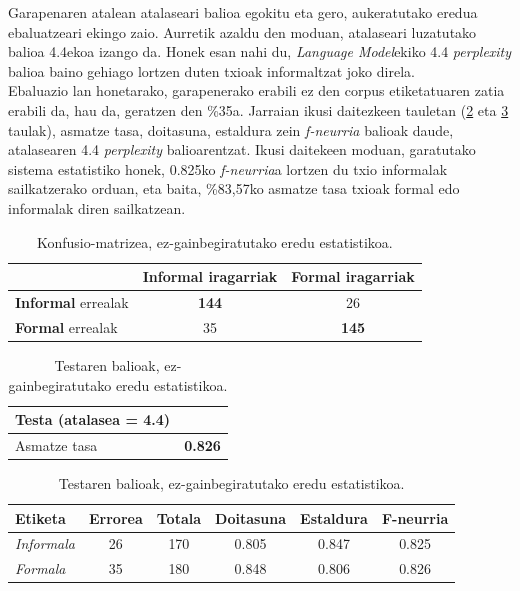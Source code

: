 \documentclass[information,article,submit,moreauthors,pdftex,10pt,a4paper]{Definitions/mdpi}
\begin{document}
\indent Garapenaren atalean atalaseari balioa egokitu eta gero, aukeratutako eredua ebaluatzeari ekingo zaio. Aurretik azaldu den moduan, atalaseari luzatutako balioa 4.4ekoa izango da. Honek esan nahi du, \textit{Language Model}ekiko 4.4 \textit{perplexity} balioa baino gehiago lortzen duten txioak informaltzat joko direla.\\
\indent Ebaluazio lan honetarako, garapenerako erabili ez den corpus etiketatuaren zatia erabili da, hau da, geratzen den \%35a. Jarraian ikusi daitezkeen tauletan (\ref{tab:Test ez-gain} eta \ref{tab:ez-gain ema} taulak), asmatze tasa, doitasuna, estaldura zein \textit{f-neurria} balioak daude, atalasearen 4.4 \textit{perplexity} balioarentzat. Ikusi daitekeen moduan, garatutako sistema estatistiko honek, 0.825ko \textit{f-neurria}a lortzen du txio informalak sailkatzerako orduan, eta baita, \%83,57ko asmatze tasa txioak formal edo informalak diren sailkatzean.

\begin{table}[H]
  \centering
  \begin{tabular}{|l|c|c|}
    \hline
    & \textbf{Informal} iragarriak & \textbf{Formal} iragarriak \\ \hline 
    \textbf{Informal} errealak & \textbf{144} & 26\\ \hline
    \textbf{Formal} errealak & 35 & \textbf{145}\\ \hline
  \end{tabular}
  \caption{Konfusio-matrizea, ez-gainbegiratutako eredu estatistikoa.}
  \label{tab:ez-gain cm}
\end{table}

\begin{table}[H]
  \centering
  \begin{tabular}{|l|r|}
    \hline
    \textbf{Testa (atalasea = 4.4)} &  \\ \hline 
    Asmatze tasa & \textbf{0.826} \\ \hline
  \end{tabular}
  \caption{Testaren balioak, ez-gainbegiratutako eredu estatistikoa.}
  \label{tab:Test ez-gain}
\end{table}

\begin{table}[H]
  \centering
  \begin{tabular}{|l|c|c|c|c|c|}
    \hline
    \textbf{Etiketa} &  \textbf{Errorea} & \textbf{Totala} & \textbf{Doitasuna} & \textbf{Estaldura} & \textbf{F-neurria}\\ \hline 
    \textit{Informala} & 26 & 170 & 0.805  & 0.847  & 0.825\\ \hline 
    \textit{Formala} & 35 & 180 & 0.848 & 0.806 & 0.826\\ \hline
  \end{tabular}
  \caption{Testaren balioak, ez-gainbegiratutako eredu estatistikoa.}
  \label{tab:ez-gain ema}
\end{table}
\end{document}
